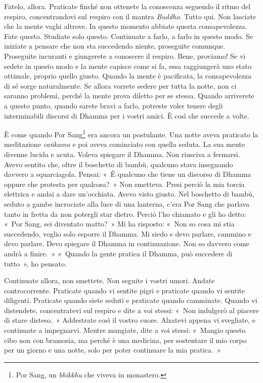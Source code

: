 Fatelo, allora. Praticate finché non ottenete la conoscenza seguendo il
ritmo del respiro, concentrandovi sul respiro con il mantra
\emph{Buddho}. Tutto qui. Non lasciate che la mente vaghi altrove. In
questo momento abbiate questa consapevolezza. Fate questo. Studiate solo
questo. Continuate a farlo, a farlo in questo modo. Se iniziate a
pensare che non sta succedendo niente, proseguite comunque. Proseguite
incuranti e giungerete a conoscere il respiro. Bene, proviamo! Se vi
sedete in questo modo e la mente capisce come si fa, essa raggiungerà
uno stato ottimale, proprio quello giusto. Quando la mente è pacificata,
la consapevolezza di sé sorge naturalmente. Se allora vorrete sedere per
tutta la notte, non ci saranno problemi, perché la mente prova diletto
per se stessa. Quando arriverete a questo punto, quando sarete bravi a
farlo, potreste voler tenere degli interminabili discorsi di Dhamma per
i vostri amici. È così che succede a volte.

È come quando Por Sang\footnote{Por Sang, un \emph{bhikkhu} che viveva
  in monastero.} era ancora un postulante. Una notte aveva praticato la
meditazione \emph{caṅkama} e poi aveva cominciato con quella seduta. La
sua mente divenne lucida e acuta. Voleva spiegare il Dhamma. Non
riusciva a fermarsi. Avevo sentito che, oltre il boschetto di bambù,
qualcuno stava insegnando davvero a squarciagola. Pensai: «~È qualcuno
che tiene un discorso di Dhamma oppure che protesta per qualcosa?~» Non
smetteva. Presi perciò la mia torcia elettrica e andai a dare
un'occhiata. Avevo visto giusto. Nel boschetto di bambù, seduto a gambe
incrociate alla luce di una lanterna, c'era Por Sang che parlava tanto
in fretta da non potergli star dietro. Perciò l'ho chiamato e gli ho
detto: «~Por Sang, sei diventato matto?~» Mi ha risposto: «~Non so cosa
mi stia succedendo, voglio solo esporre il Dhamma. Mi siedo e devo
parlare, cammino e devo parlare. Devo spiegare il Dhamma in
continuazione. Non so davvero come andrà a finire.~» «~Quando la gente
pratica il Dhamma, può succedere di tutto~», ho pensato.

Continuate allora, non smettete. Non seguite i vostri umori. Andate
controcorrente. Praticate quando vi sentite pigri e praticate quando vi
sentite diligenti. Praticate quando siete seduti e praticate quando
camminate. Quando vi distendete, concentratevi sul respiro e dite a voi
stessi: «~Non indulgerò al piacere di stare disteso.~» Addestrate così
il vostro cuore. Alzatevi appena vi svegliate, e continuate a
impegnarvi. Mentre mangiate, dite a voi stessi: «~Mangio questo cibo non
con bramosia, ma perché è una medicina, per sostentare il mio corpo per
un giorno e una notte, solo per poter continuare la mia pratica.~»

